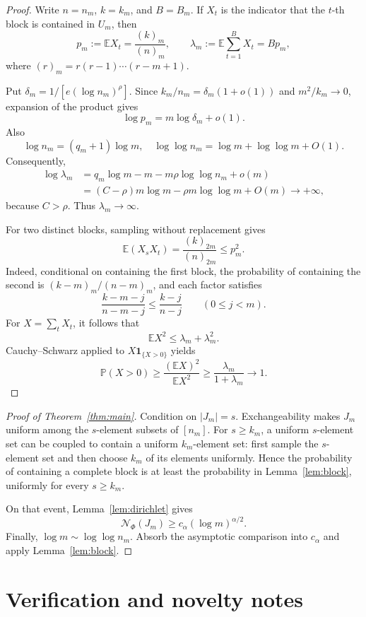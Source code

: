 \documentclass[11pt]{article}
\newcommand{\E}{\mathbb E}
\newcommand{\Pp}{\mathbb P}
\begin{document}
\begin{proof}
Write $n=n_m$, $k=k_m$, and $B=B_m$.  If $X_t$ is the indicator that the
$t$-th block is contained in $U_m$, then
\[
 p_m:=\E X_t
 =\frac{(k)_m}{(n)_m},
 \qquad
 \lambda_m:=\E\sum_{t=1}^B X_t=Bp_m,
\]
where $(r)_m=r(r-1)\cdots(r-m+1)$.

Put $\delta_m=1/[e(\log n_m)^\rho]$.  Since $k_m/n_m=\delta_m(1+o(1))$
and $m^2/k_m\to0$, expansion of the product gives
\[
 \log p_m=m\log\delta_m+o(1).
\]
Also
\[
 \log n_m=(q_m+1)\log m,
 \quad
 \log\log n_m=\log m+\log\log m+O(1).
\]
Consequently,
\begin{align*}
 \log\lambda_m
 &=q_m\log m-m-m\rho\log\log n_m+o(m)\\
 &=(C-\rho)m\log m-\rho m\log\log m+O(m)
 \longrightarrow+\infty,
\end{align*}
because $C>\rho$.  Thus $\lambda_m\to\infty$.

For two distinct blocks, sampling without replacement gives
\[
 \E(X_sX_t)=\frac{(k)_{2m}}{(n)_{2m}}\le p_m^2.
\]
Indeed, conditional on containing the first block, the probability of
containing the second is $(k-m)_m/(n-m)_m$, and each factor satisfies
\[
 \frac{k-m-j}{n-m-j}\le\frac{k-j}{n-j}
 \qquad(0\le j<m).
\]
For $X=\sum_tX_t$, it follows that
\[
 \E X^2\le\lambda_m+\lambda_m^2.
\]
Cauchy--Schwarz applied to $X\mathbf1_{\{X>0\}}$ yields
\[
 \Pp(X>0)\ge\frac{(\E X)^2}{\E X^2}
 \ge\frac{\lambda_m}{1+\lambda_m}\longrightarrow1.
\]
\end{proof}

\begin{proof}[Proof of Theorem~\ref{thm:main}]
Condition on $|J_m|=s$.  Exchangeability makes $J_m$ uniform among the
$s$-element subsets of $[n_m]$.  For $s\ge k_m$, a uniform $s$-element set
can be coupled to contain a uniform $k_m$-element set: first sample the
$s$-element set and then choose $k_m$ of its elements uniformly.  Hence the
probability of containing a complete block is at least the probability in
Lemma~\ref{lem:block}, uniformly for every $s\ge k_m$.

On that event, Lemma~\ref{lem:dirichlet} gives
\[
 \mathcal N_\Phi(J_m)\ge c_\alpha(\log m)^{\alpha/2}.
\]
Finally, $\log m\sim\log\log n_m$.  Absorb the asymptotic comparison into
$c_\alpha$ and apply Lemma~\ref{lem:block}.
\end{proof}

\section{Verification and novelty notes}
\end{document}
